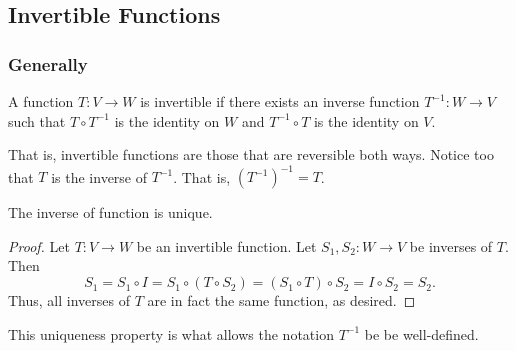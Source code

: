 \subsection{Invertible Functions}

\subsubsection{Generally}
\begin{definition}
	A function $T: V \to W$ is invertible if there exists an inverse function $T^{-1}: W \to V$ such that $T \circ T^{-1}$ is the identity on $W$ and $T^{-1} \circ T$ is the identity on $V$.
\end{definition}
That is, invertible functions are those that are reversible both ways.
Notice too that $T$ is the inverse of $T^{-1}$.
That is, $(T^{-1})^{-1} = T$.

\begin{theorem}
	The inverse of function is unique.
\end{theorem}
\begin{proof}
	Let $T: V \to W$ be an invertible function.
	Let $S_1, S_2: W \to V$ be inverses of $T$.
	Then
	\begin{equation*}
		S_1 = S_1 \circ I = S_1 \circ (T \circ S_2) = (S_1 \circ T) \circ S_2 = I \circ S_2 = S_2.
	\end{equation*}
	Thus, all inverses of $T$ are in fact the same function, as desired.
\end{proof}
This uniqueness property is what allows the notation $T^{-1}$ be be well-defined.


